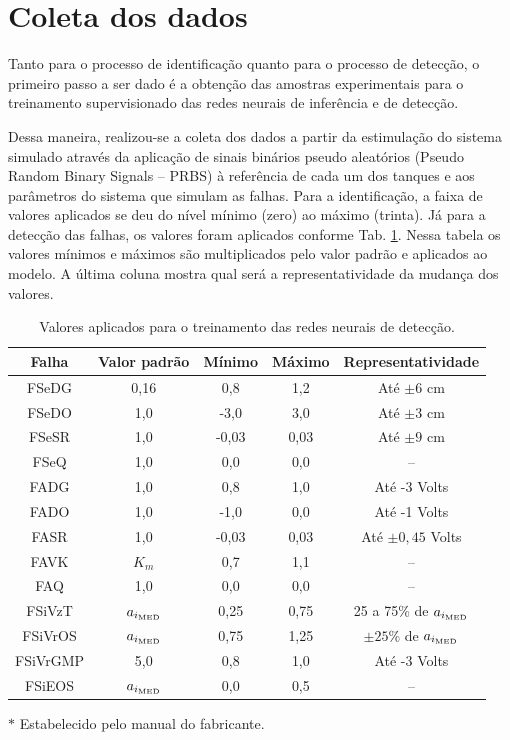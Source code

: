 \section{Coleta dos dados}
Tanto para o processo de identificação quanto para o processo de detecção, o
primeiro passo a ser dado é a obtenção das amostras experimentais para o
treinamento supervisionado das redes neurais de inferência e de detecção.

Dessa maneira, realizou-se a coleta dos dados a partir da estimulação do sistema
simulado através da aplicação de sinais binários pseudo aleatórios ({Pseudo
Random Binary Signals} -- PRBS) à referência de cada um dos tanques e aos
parâmetros do sistema que simulam as falhas. Para a identificação, a faixa de
valores aplicados se deu do nível mínimo (zero) ao máximo (trinta). Já para a
detecção das falhas, os valores foram aplicados conforme Tab.
\ref{tab:valores_treinamento}. Nessa tabela os valores mínimos e máximos são
multiplicados pelo valor padrão e aplicados ao modelo. A última coluna mostra
qual será a representatividade da mudança dos valores.

\begin{table}[htb]
\small
\caption{Valores aplicados para o treinamento das redes neurais de detecção.}
\label{tab:valores_treinamento}
\vspace{0.25cm}
\centering
\begin{threeparttable}
\begin{tabular}{|c|c|c|c|c|}
\hline
{\bf Falha} & {\bf Valor padrão} & {\bf Mínimo} & {\bf Máximo} & 
{\bf Representatividade}\\
\hline
\hline
FSeDG & 0,16\tnote{$*$} & 
0,8 & 1,2 & Até $\pm 6$ cm\\
\hline
FSeDO & 1,0 & -3,0 & 3,0 & Até $\pm 3$ cm\\
\hline
FSeSR & 1,0 & -0,03 & 0,03 & Até $\pm 9$ cm\\
\hline
FSeQ & 1,0 & 0,0 & 0,0 & -- \\
\hline
\hline
FADG & 1,0 & 0,8 & 1,0 & Até -3 Volts\\
\hline
FADO & 1,0 & -1,0 & 0,0 & Até -1 Volts\\
\hline
FASR & 1,0 & -0,03 & 0,03 & Até $\pm 0,45$ Volts\\
\hline
FAVK & $K_m$ & 0,7 & 1,1 & --\\
\hline
FAQ & 1,0 & 0,0 & 0,0 & --\\
\hline
\hline
FSiVzT & $a_{i_{\text{\tiny MED}}}$ & 
0,25 & 0,75 & 25 a 75\% de $a_{i_{\text{\tiny MED}}}$\\
\hline
FSiVrOS & $a_{i_{\text{\tiny MED}}}$ & 
0,75 & 1,25 & $\pm 25\%$ de $a_{i_{\text{\tiny MED}}}$\\
\hline
FSiVrGMP & 5,0\tnote{$*$} & 
0,8 & 1,0 & Até -3 Volts\\
\hline
FSiEOS & $a_{i_{\text{\tiny MED}}}$ & 
0,0 & 0,5 & --\\
\hline
\end{tabular}
\begin{tablenotes}
\item [$*$] Estabelecido pelo manual do fabricante.
\end{tablenotes}
\end{threeparttable}
\end{table}

